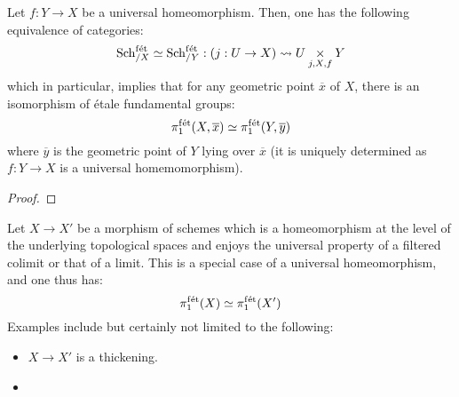                 \begin{theorem} \label{theorem: etale_fundamental_groups_are_unique_up_to_universal_homeomorphisms}
                    Let $f: Y \to X$ be a universal homeomorphism. Then, one has the following equivalence of categories:
                        $$\Sch_{/X}^{\fet} \cong \Sch_{/Y}^{\fet}: (j: U \to X) \mapsto U \x_{j, X, f} Y$$
                    which in particular, implies that for any geometric point $\overline{x}$ of $X$, there is an isomorphism of \'etale fundamental groups:
                        $$\pi_1^{\mathrm{f\acute{e}t}}(X, \overline{x}) \simeq \pi_1^{\mathrm{f\acute{e}t}}(Y, \overline{y})$$
                    where $\overline{y}$ is the geometric point of $Y$ lying over $\overline{x}$ (it is uniquely determined as $f: Y \to X$ is a universal homemomorphism). 
                \end{theorem}
                    \begin{proof}
                        
                    \end{proof}
                \begin{corollary}
                    Let $X \to X'$ be a morphism of schemes which is a homeomorphism at the level of the underlying topological spaces and enjoys the universal property of a  filtered colimit or that of a limit. This is a special case of a universal homeomorphism, and one thus has:
                        $$\pi_1^{\mathrm{f\acute{e}t}}(X) \simeq \pi_1^{\mathrm{f\acute{e}t}}(X')$$
                    Examples include but certainly not limited to the following:
                        \begin{itemize}
                            \item $X \to X'$ is a thickening.
                            \item 
                        \end{itemize}
                \end{corollary}
                
